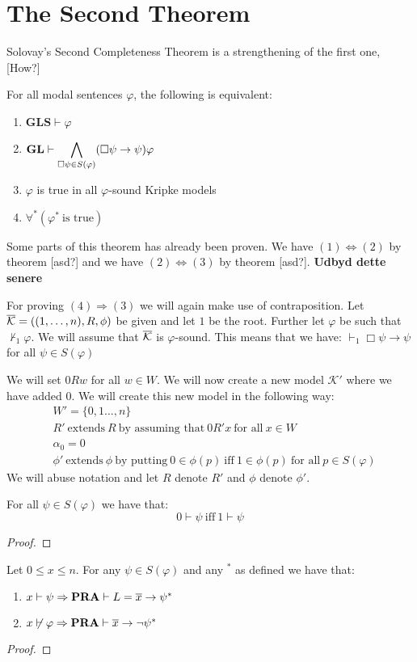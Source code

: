 \documentclass[../main.tex]{subfiles}
\begin{document}
\section{The Second Theorem}
Solovay's Second Completeness Theorem is a strengthening of the first one,
[How?]
\begin{thm}
	For all modal sentences $\varphi$, the following is equivalent:
	\begin{enumerate}
		\item $\textbf{GLS}\vdash\varphi$
		\item $\text{\textbf{GL}}\vdash\displaystyle\bigwedge_{\Box \psi\in
			S(\varphi)}(\Box\psi\rightarrow\psi)\varphi$
		\item $\varphi$ is true in all $\varphi$-sound Kripke models
		\item $\forall^*(\varphi^*\ \text{is true})$
	\end{enumerate}
\end{thm}
Some parts of this theorem has already been proven. We have
$(1)\Leftrightarrow(2)$ by theorem [asd?] and we have $(2)\Leftrightarrow(3)$
by theorem [asd?]. \textbf{Udbyd dette senere}

For proving $(4)\Rightarrow(3)$ we will again make use of contraposition. Let
$\mathcal{\overline K}=((1,\ldots,n),R,\phi)$ be given and let $1$ be the root.
Further let $\varphi$ be such that $\not\vdash_1\varphi$.
We
will assume that $\mathcal{\overline K}$ is $\varphi$-sound. This means that we have:
$\vdash_1\Box\psi\rightarrow\psi$ for all $\psi\in S(\varphi)$

We will set $0Rw$ for all $w\in W$. We will now create a new model
$\mathcal{K'}$ where we have added $0$. We will create this new model in the
following way:
\begin{align*}
	&W'=\{0,1\ldots,n\}\\
	&R'\ \text{extends}\ R\ \text{by assuming that}\ 0R'x\ \text{for all}\
	x\in W\\
	&\alpha_0=0\\
	&\phi'\ \text{extends}\ \phi\ \text{by putting}\ 0\in\phi(p)\
	\text{iff}\ 1\in\phi(p)\ \text{for all}\ p\in S(\varphi)
\end{align*}
We will abuse notation and let $R$ denote $R'$ and $\phi$ denote $\phi'$.
\begin{lem}
	For all $\psi\in S(\varphi)$ we have that:
	$$0\vdash\psi\ \text{iff}\ 1\vdash \psi$$
\end{lem}
\begin{proof}
\end{proof}
\begin{lem}
	Let $0\leq x\leq n$. For any $\psi\in S(\varphi)$ and any $^*$ as
	defined we have that:
	\begin{enumerate}
		\item $x\vdash\psi\Rightarrow\text{\textbf{PRA}}\vdash L=\overline
			x\rightarrow\psi^*$
		\item $x\not\vdash\varphi\Rightarrow \text{\textbf{PRA}}\vdash \overline x\rightarrow
			\neg\psi^*$
	\end{enumerate}
\end{lem}
\begin{proof}
\end{proof}
\end{document}

